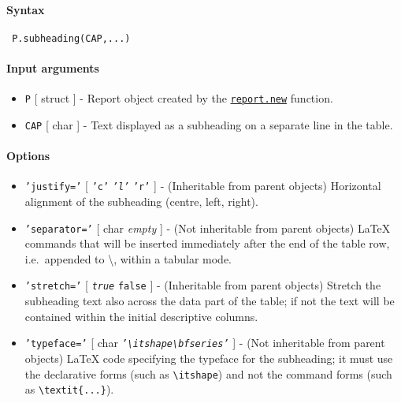 


	\paragraph{Syntax}
 
 \begin{verbatim}
 P.subheading(CAP,...)
 \end{verbatim}
 
 \paragraph{Input arguments}
 
 \begin{itemize}
 \item
   \texttt{P} {[} struct {]} - Report object created by the
   \href{report/new}{\texttt{report.new}} function.
 \item
   \texttt{CAP} {[} char {]} - Text displayed as a subheading on a
   separate line in the table.
 \end{itemize}
 
 \paragraph{Options}
 
 \begin{itemize}
 \item
   \texttt{'justify='} {[} \texttt{'c'} \textbar{} \emph{\texttt{'l'}}
   \textbar{} \texttt{'r'} {]} - (Inheritable from parent objects)
   Horizontal alignment of the subheading (centre, left, right).
 \item
   \texttt{'separator='} {[} char \textbar{} \emph{empty} {]} - (Not
   inheritable from parent objects) LaTeX commands that will be inserted
   immediately after the end of the table row, i.e.~appended to
   \textbackslash{}, within a tabular mode.
 \item
   \texttt{'stretch='} {[} \emph{\texttt{true}} \textbar{} \texttt{false}
   {]} - (Inheritable from parent objects) Stretch the subheading text
   also across the data part of the table; if not the text will be
   contained within the initial descriptive columns.
 \item
   \texttt{'typeface='} {[} char \textbar{}
   \emph{\texttt{'\textbackslash{}itshape\textbackslash{}bfseries'}} {]}
   - (Not inheritable from parent objects) LaTeX code specifying the
   typeface for the subheading; it must use the declarative forms (such
   as \texttt{\textbackslash{}itshape}) and not the command forms (such
   as \texttt{\textbackslash{}textit\{...\}}).
 \end{itemize}
 
